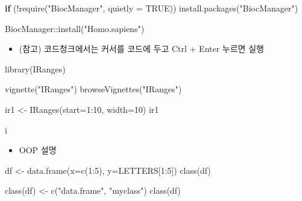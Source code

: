 \documentclass[
]{book}
\newenvironment{Shaded}{\begin{snugshade}}{\end{snugshade}}
\newcommand{\AttributeTok}[1]{\textcolor[rgb]{0.77,0.63,0.00}{#1}}
\newcommand{\ConstantTok}[1]{\textcolor[rgb]{0.00,0.00,0.00}{#1}}
\newcommand{\ControlFlowTok}[1]{\textcolor[rgb]{0.13,0.29,0.53}{\textbf{#1}}}
\newcommand{\DecValTok}[1]{\textcolor[rgb]{0.00,0.00,0.81}{#1}}
\newcommand{\FunctionTok}[1]{\textcolor[rgb]{0.00,0.00,0.00}{#1}}
\newcommand{\NormalTok}[1]{#1}
\newcommand{\OtherTok}[1]{\textcolor[rgb]{0.56,0.35,0.01}{#1}}
\newcommand{\SpecialCharTok}[1]{\textcolor[rgb]{0.00,0.00,0.00}{#1}}
\newcommand{\StringTok}[1]{\textcolor[rgb]{0.31,0.60,0.02}{#1}}
\providecommand{\tightlist}{%
  \setlength{\itemsep}{0pt}\setlength{\parskip}{0pt}}
\begin{document}
\begin{Shaded}
\begin{Highlighting}[]
\ControlFlowTok{if}\NormalTok{ (}\SpecialCharTok{!}\FunctionTok{require}\NormalTok{(}\StringTok{"BiocManager"}\NormalTok{, }\AttributeTok{quietly =} \ConstantTok{TRUE}\NormalTok{))}
    \FunctionTok{install.packages}\NormalTok{(}\StringTok{"BiocManager"}\NormalTok{)}

\NormalTok{BiocManager}\SpecialCharTok{::}\FunctionTok{install}\NormalTok{(}\StringTok{"Homo.sapiens"}\NormalTok{)}
\end{Highlighting}
\end{Shaded}

\begin{itemize}
\tightlist
\item
  (참고) 코드청크에서는 커서를 코드에 두고 Ctrl + Enter 누르면 실행
\end{itemize}

\begin{Shaded}
\begin{Highlighting}[]
\FunctionTok{library}\NormalTok{(IRanges)}

\FunctionTok{vignette}\NormalTok{(}\StringTok{"IRanges"}\NormalTok{)}
\FunctionTok{browseVignettes}\NormalTok{(}\StringTok{"IRanges"}\NormalTok{)}

\NormalTok{ir1 }\OtherTok{\textless{}{-}} \FunctionTok{IRanges}\NormalTok{(}\AttributeTok{start=}\DecValTok{1}\SpecialCharTok{:}\DecValTok{10}\NormalTok{, }\AttributeTok{width=}\DecValTok{10}\NormalTok{)}
\NormalTok{ir1}

\NormalTok{i}
\end{Highlighting}
\end{Shaded}

\begin{itemize}
\tightlist
\item
  OOP 설명
\end{itemize}

\begin{Shaded}
\begin{Highlighting}[]

\NormalTok{df }\OtherTok{\textless{}{-}} \FunctionTok{data.frame}\NormalTok{(}\AttributeTok{x=}\FunctionTok{c}\NormalTok{(}\DecValTok{1}\SpecialCharTok{:}\DecValTok{5}\NormalTok{), }\AttributeTok{y=}\NormalTok{LETTERS[}\DecValTok{1}\SpecialCharTok{:}\DecValTok{5}\NormalTok{])}
\FunctionTok{class}\NormalTok{(df)}

\FunctionTok{class}\NormalTok{(df) }\OtherTok{\textless{}{-}} \FunctionTok{c}\NormalTok{(}\StringTok{"data.frame"}\NormalTok{, }\StringTok{"myclass"}\NormalTok{)}
\FunctionTok{class}\NormalTok{(df)}
\end{Highlighting}
\end{Shaded}
\end{document}
